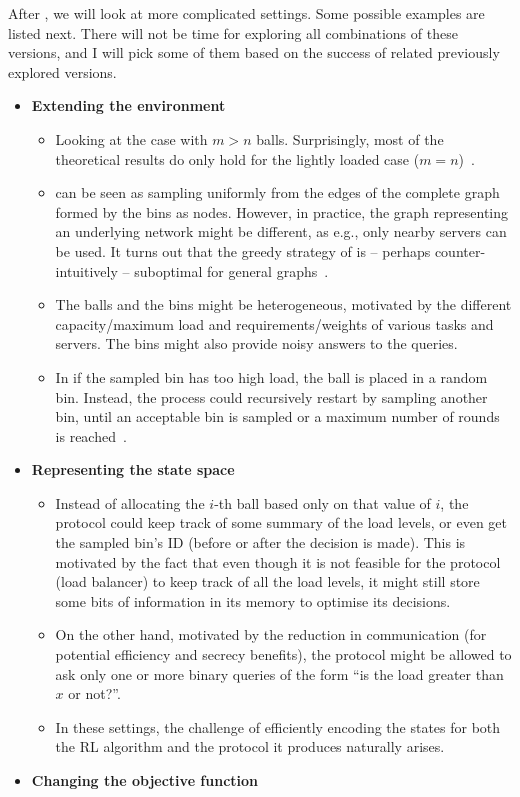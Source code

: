 After \TwoThinning, we will look at more complicated settings. Some possible examples are listed next. There will not be time for exploring all combinations of these versions, and I will pick some of them based on the success of related previously explored versions.
\begin{itemize}
    \item
    \textbf{Extending the environment}
    \begin{itemize}
        \item
        Looking at the case with $m>n$ balls. Surprisingly, most of the theoretical results do only hold for the lightly loaded case ($m=n$)~\cite{berenbrink2006heavilyloaded}.
        \item
        \TwoChoice can be seen as sampling uniformly from the edges of the complete graph formed by the bins as nodes. However, in practice, the graph representing an underlying network might be different, as e.g., only nearby servers can be used. It turns out that the greedy strategy of \TwoChoice is -- perhaps counter-intuitively -- suboptimal for general graphs~\cite{bansal2021twochoicegraphical}.
        \item
        The balls and the bins might be heterogeneous, motivated by the different capacity/maximum load and requirements/weights of various tasks and servers. The bins might also provide noisy answers to the queries.
        \item
        In \TwoThinning if the sampled bin has too high load, the ball is placed in a random bin. Instead, the process could recursively restart by sampling another bin, until an acceptable bin is sampled or a maximum number of rounds is reached~\cite{czumaj1997randomized}.
    \end{itemize}
    
    \item
    \textbf{Representing the state space}
    
    \begin{itemize}
        \item
        Instead of allocating the $i$-th ball based only on that value of $i$, the protocol could keep track of some summary of the load levels, or even get the sampled bin's ID (before or after the decision is made). This is motivated by the fact that even though it is not feasible for the protocol (load balancer) to keep track of all the load levels, it might still store some bits of information in its memory to optimise its decisions.
        \item
        On the other hand, motivated by the reduction in communication (for potential efficiency and secrecy benefits), the protocol might be allowed to ask only one or more binary queries of the form ``is the load greater than $x$ or not?''.
        \item
        In these settings, the challenge of efficiently encoding the states for both the RL algorithm and the protocol it produces naturally arises.
    \end{itemize}
    \item
    \textbf{Changing the objective function}
    

\end{itemize}
